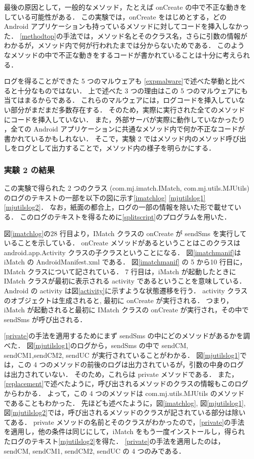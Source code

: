 最後の原因として，一般的なメソッド，たとえば onCreate の中で不正な動きをしている可能性がある．
この実験では，onCreate をはじめとする，どの Android アプリケーションも持っているメソッドに対してコードを挿入しなかった．
\ref{methodtop}の手法では，メソッド名とそのクラス名，さらに引数の情報がわかるが，メソッド内で何が行われたまでは分からないためである．
このようなメソッドの中で不正な動きをするコードが書かれていることは十分に考えられる．


ログを得ることができた 5 つのマルウェアも \ref{expmalware}で述べた挙動と比べると十分なものではない．
上で述べた 3 つの理由はこの 5 つのマルウェアにも当てはまるからである．
これらのマルウェアには，ログコードを挿入していない部分がまだまだ多数存在する．
そのため，実際に実行された全てのメソッドにコードを挿入していない．
また，外部サーバが実際に動作していなかったり ，全ての Android アプリケーションに共通なメソッド内で何か不正なコードが書かれているかもしれない．
そこで，実験 2 ではメソッド内のメソッド呼び出しをログとして出力することで，メソッド内の様子を明らかにする．


\subsubsection{実験 2 の結果}
この実験で得られた 2 つのクラス (com.mj.imatch.IMatch, com.mj.utils.MJUtils) のログのテキストの一部を以下の図に示す\ref{imatchlog} \ref{mjutilslog1} \ref{mjutilslog2}．
なお，紙面の都合上，ログの一部の情報を除いた形で載せている．
このログのテキストを得るために\ref{splitscript}のプログラムを用いた．

図\ref{imatchlog}の28 行目より，IMatch クラスの onCreate が sendSms を実行していることを示している．
onCreate メソッドがあるということはこのクラスは android.app.Activity クラスの子クラスということになる．
図\ref{imatchmanif}は iMatch の AndroidManifest.xml である．
図\ref{imatchmanif} の 5 から10 行目に，IMatch クラスについて記されている．
7 行目は，iMatch が起動したときに IMatch クラスが最初に表示される activity であるということを意味している．
Android の activity は図\ref{activity}に示すような状態遷移を行う\cite{activity}．
activity クラスのオブジェクトは生成されると, 最初に onCreate が実行される．
つまり，iMatch が起動されると最初に IMatch クラスの onCreate が実行され，その中で sendSms が呼び出される．

\ref{private}の手法を適用するためにまず sendSms の中にどのメソッドがあるかを調べた．
図\ref{mjutilslog1}のログから，sendSms の中で sendCM, sendCM1,sendCM2, sendUC が実行されていることがわかる．
図\ref{mjutilslog1}では，この 4 つのメソッドの前後のログは出力されているが，引数の中身のログは出力されていない．
そのため，これらは private メソッドである．
また，\ref{replacement}で述べたように，呼び出されるメソッドのクラスの情報もこのログからわかる．
よって，この 4 つのメソッドは com.mj.utils.MJUtils のメソッドであることもわかった．
先ほども述べたように，図\ref{imatchlog}, 図\ref{mjutilslog1},  図\ref{mjutilslog2}では，呼び出されるメソッドのクラスが記されている部分は除いてある．
private メソッドの名前とそのクラスがわかったので，\ref{private}の手法を適用し，他の条件は同じにして，iMatch をもう一度インストールし，得られたログのテキスト\ref{mjutilslog2}を得た．
\ref{private}の手法を適用したのは，sendCM, sendCM1, sendCM2, sendUC の 4 つのみである．


